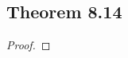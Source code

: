 \documentclass[../../main.tex]{subfiles}
\begin{document}
\subsection{Theorem 8.14}
\begin{wts}

\end{wts}
\begin{proof}

\end{proof}
\end{document}
